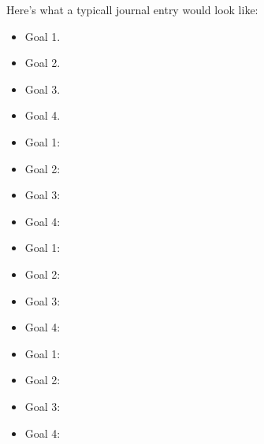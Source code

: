 Here's what a typicall journal entry would look like:

\morning

\begin{goals}
  \begin{itemize}
    \item Goal 1.
    \item Goal 2.
    \item Goal 3.
    \item Goal 4.
  \end{itemize}
\end{goals}


\lipsum[10]


\lipsum[10]

\afternoon

\begin{status}
  \begin{itemize}
    \item Goal 1: 
    \item Goal 2: 
    \item Goal 3: 
    \item Goal 4: 
  \end{itemize}
\end{status}


\lipsum[10]


\lipsum[10]

\evening

\begin{status}
  \begin{itemize}
    \item Goal 1: 
    \item Goal 2: 
    \item Goal 3: 
    \item Goal 4: 
  \end{itemize}
\end{status}


\lipsum[10]


\lipsum[10]

\night

\begin{results}
  \begin{itemize}
    \item Goal 1: 
    \item Goal 2: 
    \item Goal 3: 
    \item Goal 4: 
  \end{itemize}
\end{results}


\lipsum[10]


\lipsum[10]

